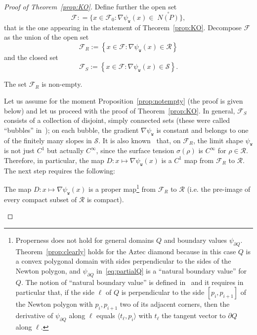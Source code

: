 \documentclass[AHL,Unicode,longabstracts,published]{cedram}
\newcommand{\ttw}{\mathtt{w}}
\newcommand{\clS}{\mathcal{S}}
\newcommand{\clR}{\mathcal{R}}
\newcommand{\clF}{\mathcal{F}}
\newcommand{\ttw}{\mathtt{w}}
\begin{document}
\begin{proof}[Proof of Theorem~\ref{prop:KO}]
Define further the open set
\begin{equation}\label{eq:F0}
\clF: =\{x\in \clF_0:\nabla\psi_{\ttw}(x)\in \;\stackrel \circ{N(P)}\},
\end{equation}
that is the one appearing in the statement of Theorem~\ref{prop:KO}. Decompose $\clF$ as the union of the open set
\begin{equation}\label{eq:Fr}
\clF_R:=\left\{x\in \clF: \nabla\psi_{\ttw}(x)\in \clR\right\}
\end{equation}
and the closed set
\begin{equation}\label{eq:Fs}
\clF_S:=\left\{x\in \clF: \nabla\psi_{\ttw}(x)\in \clS\right\}.
\end{equation}
\begin{prop}\label{prop:notempty}
The set $\clF_R$ is non-empty.
\end{prop}

Let us assume for the moment Proposition~\ref{prop:notempty} (the proof is given below) and let us proceed with the proof of Theorem~\ref{prop:KO}. In general, $ \clF_S$ consists of a collection of disjoint, simply connected sets (these were called ``bubbles'' in~\cite{KO07}); on each bubble, the gradient $\nabla\psi_{\ttw}$ is constant and belongs to one of the finitely many slopes in $\clS$. It is also known~\cite{morrey2009multiple} that, on $ \clF_R$, the limit shape $\psi_{\ttw}$ is not just $C^1$ but actually $C^\infty$, since the surface tension $\sigma(\rho)$ is $C^\infty$ for $\rho\in \clR$. Therefore, in particular, the map $D:x\mapsto \nabla \psi_{\ttw}(x)$ is a $C^1$ map from $\clF_R$ to $\clR$. The next step requires the following:

\begin{theo}
The map $D:x\mapsto \nabla \psi_{\ttw}(x)$ is a proper map\footnote{\label{foot:natural}
Properness does not hold for general domains $Q$ and boundary values $\psi_{\partial Q}$. Theorem~\ref{prop:clearly} holds for the Aztec diamond because in this case $Q$ is a convex polygonal domain with sides perpendicular to the sides of the Newton polygon, and $\psi_{\partial Q}$ in~\eqref{eq:partialQ} is a ``natural boundary value'' for $Q$. The notion of ``natural boundary value'' is defined in~\cite{Duse} and it requires in particular that, if the side $\ell$ of $Q$ is perpendicular to the side $[p_i,p_{i+1}]$ of the Newton polygon with $p_i,p_{i+1}$ two of its adjacent corners, then the derivative of $\psi_{\partial Q}$ along $\ell$ equals $\langle t_\ell,p_i\rangle$ with $t_\ell$ the tangent vector to $\partial Q$ along $\ell$. } from $\clF_R$ to $\clR$ (i.e. the pre-image of every compact subset of $\clR$ is compact).
\end{theo}


\end{proof}
\end{document}
